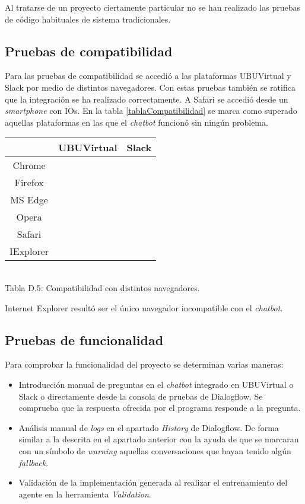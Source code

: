 Al tratarse de un proyecto ciertamente particular no se han realizado las pruebas de código habituales de sistema tradicionales.

\subsection{Pruebas de compatibilidad}

Para las pruebas de compatibilidad se accedió a las plataformas UBUVirtual y Slack por medio de distintos navegadores. Con estas pruebas también se ratifica que la integración se ha realizado correctamente.
A Safari se accedió desde un \textit{smartphone} con IOs.
En la tabla \ref{tablaCompatibilidad} se marca como superado aquellas plataformas en las que el \textit{chatbot} funcionó sin ningún problema.

\renewcommand{\arraystretch}{1.2}
	\begin{tabular}{|c|c|c|}  
		\cline{2-3}
		\multicolumn{1}{c|}{} & UBUVirtual & Slack \\
		\hline
		Chrome & \cmark & \cmark \\
		\hline
		Firefox & \cmark & \cmark \\
		\hline
		MS Edge & \cmark & \cmark \\
		\hline
		Opera & \cmark & \cmark \\
		\hline
		Safari & \cmark & \cmark \\
		\hline
		IExplorer & \xmark & \xmark \\
		\hline  
	\end{tabular}\\

Tabla D.5: Compatibilidad con distintos navegadores.
\label{tablaCompatibilidad}

Internet Explorer resultó ser el único navegador incompatible con el \textit{chatbot}.

\subsection{Pruebas de funcionalidad}

Para comprobar la funcionalidad del proyecto se determinan varias maneras:
\begin{itemize}
	\tightlist
	\item 
	Introducción manual de preguntas en el \textit{chatbot} integrado en UBUVirtual o Slack o directamente desde la consola de pruebas de Dialogflow. Se comprueba que la respuesta ofrecida por el programa responde a la pregunta.
	\item 
	Análisis manual de \textit{logs} en el apartado \textit{History} de Dialogflow. De forma similar a la descrita en el apartado anterior con la ayuda de que se marcaran con un símbolo de \textit{warning} aquellas conversaciones que hayan tenido algún \textit{fallback}.
	\item 
	Validación de la implementación generada al realizar el entrenamiento del agente en la herramienta \textit{Validation}.
\end{itemize}

